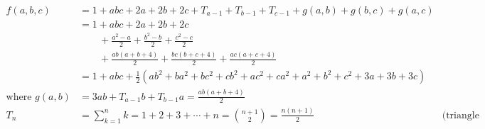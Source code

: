 \begin{align*}
f(a,b,c) &= 1 + abc + 2a + 2b + 2c +  T_{a-1} + T_{b-1} + T_{c-1} + g(a,b) + g(b,c) + g(a,c) \\
&= 1 + abc + 2a + 2b + 2c
\\&\qquad+ \frac{a^2 -a}{2} + \frac{b^2 -b}{2} + \frac{c^2-c}{2}
\\&\qquad+ \frac{ab(a+b+4)}{2} + \frac{bc(b+c+4)}{2} + \frac{ac(a+c+4)}{2}
\\&=1 + abc + \frac{1}{2}(ab^2 + ba^2 + bc^2 + cb^2 + ac^2 + ca^2 + a^2 + b^2 + c^2 + 3a + 3b + 3c)
\\
\text{where } g(a,b) &= 3ab + T_{a-1}b + T_{b-1}a 
= \frac{ab(a+b+4)}{2}\\
T_{n}&=\sum _{k=1}^{n}k=1+2+3+\dotsb +n={n+1 \choose 2}={\frac {n(n+1)}{2}} &\text{(triangle number)}
\end{align*}
